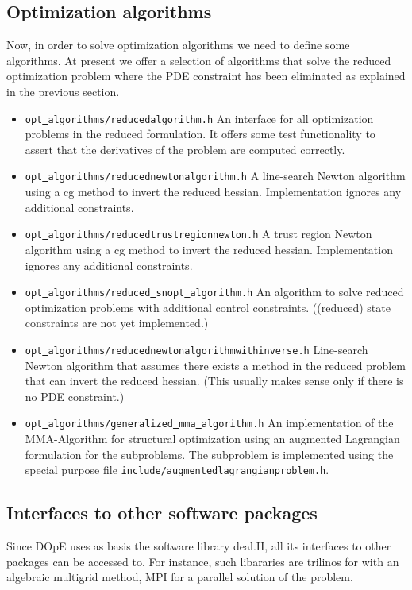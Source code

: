 \documentclass[prodmode,acmtoms]{acmsmall}
\numberwithin{equation}{section}
\begin{document}
\subsection{Optimization algorithms}
Now, in order to solve optimization algorithms we need to define some algorithms.
At present we offer a selection of algorithms that solve the reduced optimization 
problem where the PDE constraint has been eliminated as explained in the previous section.
\begin{itemize}
\item \texttt{opt\underline{ }algorithms/reducedalgorithm.h} An interface for all 
  optimization problems in the reduced formulation. It offers some test functionality
  to assert that the derivatives of the problem are computed correctly.
\item \texttt{opt\underline{ }algorithms/reducednewtonalgorithm.h}
  A line-search Newton algorithm using a cg method to invert the reduced hessian. 
  Implementation ignores any additional constraints.
\item \texttt{opt\underline{ }algorithms/reducedtrustregionnewton.h}
  A trust region Newton algorithm using a cg method to invert the reduced hessian.
  Implementation ignores any additional constraints.
\item \texttt{opt\underline{ }algorithms/reduced\underline{ }snopt\underline{ }algorithm.h}
  An algorithm to solve reduced optimization problems with additional control constraints.
  ((reduced) state constraints are not yet implemented.)
\item \texttt{opt\underline{ }algorithms/reducednewtonalgorithmwithinverse.h}
  Line-search Newton algorithm that assumes there exists a method in the reduced problem
  that can invert the reduced hessian. (This usually makes sense only if there is no 
  PDE constraint.)
\item \texttt{opt\underline{ }algorithms/generalized\underline{ }mma\underline{ }algorithm.h}
  An implementation of the MMA-Algorithm for structural optimization using an augmented
  Lagrangian formulation for the subproblems. The subproblem is implemented using the 
  special purpose file
  \texttt{include/augmentedlagrangianproblem.h}.
\end{itemize} 



\subsection{Interfaces to other software packages}
Since DOpE uses as basis the software library deal.II, all its interfaces
to other packages can be accessed to. For instance, such libararies 
are trilinos for with an algebraic multigrid method, MPI for a parallel
solution of the problem.
\end{document}
